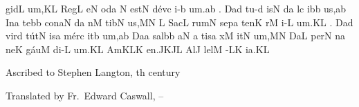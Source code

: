 \sgn gid\punctum L\egn
\sgn {}u{m,}\punctum K\augmentum L\egn
\spatium
\divisiominor
\spatium
\sgn R{e}g\punctum L\egn
\sgn {}e{}\punctum N\egn
\spatium
{}od\punctum a\egn
\spatium
\custos N
\lineaproxima
\sgn est\punctum N\egn
\spatium
\sgn d{\'e}v\punctum c\egn
\sgn {}i{-}\punctum b\egn
\sgn {}u{m.}\punctum a\augmentum b\egn
\spatium
\divisiofinalis
\spatium
{}.{}\egn
\spatium
\sgn Da{}\punctum d\egn
\spatium
\sgn t{u}{-}\punctum d\egn
\sgn {}is\punctum N\egn
\spatium
{}d\punctum a\egn
{}l\punctum c\egn
\sgn {}ib\punctum b\egn
\sgn {}u{s,}\punctum a\augmentum b\egn
\spatium
\divisiominor
\spatium
\sgn {}In\punctum a\egn
\spatium
\sgn te{}\bmolle b\punctum b\egn
\spatium
\sgn con\clivis aN\egn
{}d\punctum a\egn
{}n\punctum M\egn
\sgn tib\punctum N\egn
\sgn {}u{s,}\punctum M\augmentum N\egn
\spatium
\divisiominor
\spatium
\custos L
\lineaproxima
\sgn S{a}c\punctum L\egn
\sgn rum\punctum N\egn
\spatium
\sgn sep\punctum a\egn
\sgn ten\punctum K\egn
{}r\engl{}\punctum M\egn
\sgn {}i{-}\punctum L\egn
\sgn {}u{m.}\punctum K\augmentum L\egn
\spatium
\divisiofinalis
{}.{}\egn
\spatium
\sgn Da{}\punctum d\egn
\spatium
\sgn v{i}{r}\punctum d\egn
\sgn t{\'u}t\punctum N\egn
\sgn {}is\punctum a\egn
\spatium
\sgn m{\'e}r\punctum c\egn
\sgn {}it\punctum b\egn
\sgn {}u{m,}\punctum a\augmentum b\egn
\spatium
\divisiominor
\spatium
\sgn Da{}\punctum a\egn
\spatium
\sgn sal\bmolle b\punctum b\egn
{}\clivis aN\egn
\custos a
\lineaproxima
\sgn tis\punctum a\egn
\spatium
{}x\punctum M\egn
\sgn {}it\punctum N\egn
\sgn {}u{m,}\punctum M\augmentum N\egn
\spatium
\divisiominor
\spatium
\sgn Da{}\punctum L\egn
\spatium
\sgn per\punctum N\egn
{}n\punctum a\egn
\sgn ne{}\punctum K\egn
\spatium
\sgn g{\'a}u\punctum M\egn
\sgn di{-}\punctum L\egn
\sgn {}u{m.}\punctum K\augmentum L\egn
\spatium
\divisiofinalis
\spatium
\sgn {}Am\torculus KLK\egn
\sgn {}e{n.}\pes JK\augmentumduplex JL\egn
\spatium
\divisiominima
\spatium
\sgn {}Al\punctum J\egn
\sgn lel\punctum M\egn
{}-\cephalicus LK\egn
\sgn ia.\punctum K\augmentum L\egn
\Finisgregoriana


\medskip

\source Ascribed to Stephen Langton, {}th century

\source Translated by Fr.~Edward Caswall, {}--



